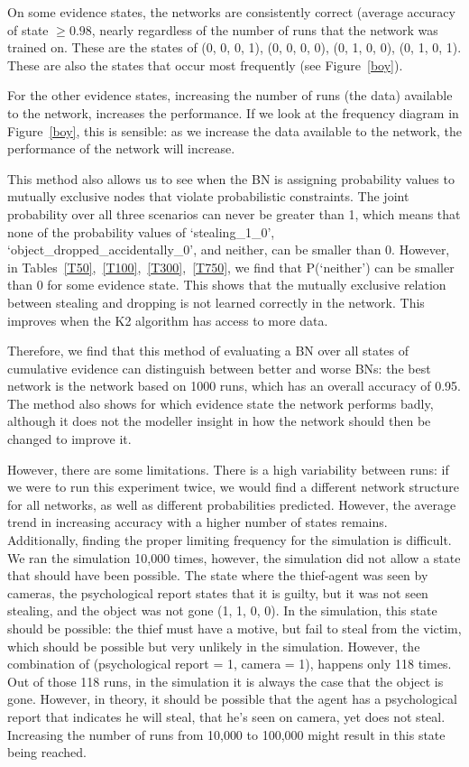 \documentclass[12pt]{article}
\begin{document}
On some evidence states, the networks are consistently correct (average accuracy of state $\geq 0.98$, nearly regardless of the number of runs that the network was trained on. These are the states of (0, 0, 0, 1), (0, 0, 0, 0), (0, 1, 0, 0), (0, 1, 0, 1). These are also the states that occur most frequently (see Figure~\ref{boy}).

For the other evidence states, increasing the number of runs (the data) available to the network, increases the performance. If we look at the frequency diagram in Figure~\ref{boy}, this is sensible: as we increase the data available to the network, the performance of the network will increase.


This method also allows us to see when the BN is assigning probability values to mutually exclusive nodes that violate probabilistic constraints. The joint probability over all three scenarios can never be greater than 1, which means that none of the probability values of `stealing\_1\_0', `object\_dropped\_accidentally\_0', and neither, can be smaller than 0. However, in Tables~\ref{T50},~\ref{T100},~\ref{T300},~\ref{T750}, we find that P(`neither') can be smaller than 0 for some evidence state.  This shows that the mutually exclusive relation between stealing and dropping is not learned correctly in the network. This improves when the K2 algorithm has access to more data.


Therefore, we find that this method of evaluating a BN over all states of cumulative evidence can distinguish between better and worse BNs: the best network is the network based on 1000 runs, which has an overall accuracy of 0.95. The method also shows for which evidence state the network performs badly, although it does not the modeller insight in how the network should then be changed to improve it. 

However, there are some limitations. There is a high variability between runs: if we were to run this experiment twice, we would find a different network structure for all networks, as well as different probabilities predicted. However, the average trend in increasing accuracy with a higher number of states remains. Additionally, finding the proper limiting frequency for the simulation is difficult. We ran the simulation 10,000 times, however, the simulation did not allow a state that should have been possible. The state where the thief-agent was seen by cameras, the psychological report states that it is guilty, but it was not seen stealing, and the object was not gone (1, 1, 0, 0). In the simulation, this state should be possible: the thief must have a motive, but fail to steal from the victim, which should be possible but very unlikely in the simulation. However, the combination of (psychological report = 1, camera = 1), happens only 118 times. Out of those 118 runs, in the simulation it is always the case that the object is gone. However, in theory, it should be possible that the agent has a psychological report that indicates he will steal, that he's seen on camera, yet does not steal. Increasing the number of runs from 10,000 to 100,000 might result in this state being reached.
\end{document}
